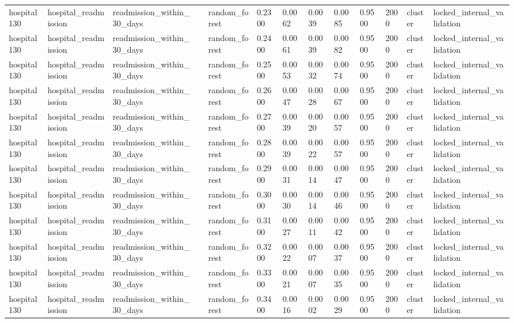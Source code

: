 \begin{tabular}{lllllllllllll}
hospital130 & hospital\_readmission & readmission\_within\_30\_days &  & random\_forest & 0.2300 & 0.0062 & 0.0039 & 0.0085 & 0.9500 & 2000 & cluster & locked\_internal\_validation \\
hospital130 & hospital\_readmission & readmission\_within\_30\_days &  & random\_forest & 0.2400 & 0.0061 & 0.0039 & 0.0082 & 0.9500 & 2000 & cluster & locked\_internal\_validation \\
hospital130 & hospital\_readmission & readmission\_within\_30\_days &  & random\_forest & 0.2500 & 0.0053 & 0.0032 & 0.0074 & 0.9500 & 2000 & cluster & locked\_internal\_validation \\
hospital130 & hospital\_readmission & readmission\_within\_30\_days &  & random\_forest & 0.2600 & 0.0047 & 0.0028 & 0.0067 & 0.9500 & 2000 & cluster & locked\_internal\_validation \\
hospital130 & hospital\_readmission & readmission\_within\_30\_days &  & random\_forest & 0.2700 & 0.0039 & 0.0020 & 0.0057 & 0.9500 & 2000 & cluster & locked\_internal\_validation \\
hospital130 & hospital\_readmission & readmission\_within\_30\_days &  & random\_forest & 0.2800 & 0.0039 & 0.0022 & 0.0057 & 0.9500 & 2000 & cluster & locked\_internal\_validation \\
hospital130 & hospital\_readmission & readmission\_within\_30\_days &  & random\_forest & 0.2900 & 0.0031 & 0.0014 & 0.0047 & 0.9500 & 2000 & cluster & locked\_internal\_validation \\
hospital130 & hospital\_readmission & readmission\_within\_30\_days &  & random\_forest & 0.3000 & 0.0030 & 0.0014 & 0.0046 & 0.9500 & 2000 & cluster & locked\_internal\_validation \\
hospital130 & hospital\_readmission & readmission\_within\_30\_days &  & random\_forest & 0.3100 & 0.0027 & 0.0011 & 0.0042 & 0.9500 & 2000 & cluster & locked\_internal\_validation \\
hospital130 & hospital\_readmission & readmission\_within\_30\_days &  & random\_forest & 0.3200 & 0.0022 & 0.0007 & 0.0037 & 0.9500 & 2000 & cluster & locked\_internal\_validation \\
hospital130 & hospital\_readmission & readmission\_within\_30\_days &  & random\_forest & 0.3300 & 0.0021 & 0.0007 & 0.0035 & 0.9500 & 2000 & cluster & locked\_internal\_validation \\
hospital130 & hospital\_readmission & readmission\_within\_30\_days &  & random\_forest & 0.3400 & 0.0016 & 0.0002 & 0.0029 & 0.9500 & 2000 & cluster & locked\_internal\_validation \\

\end{tabular}
